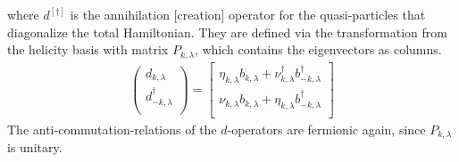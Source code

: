 where $d^{[\dag]}$ is the annihilation [creation] operator for the quasi-particles that diagonalize the total Hamiltonian.
They are defined via the transformation from the helicity basis with matrix $P_{k,\lambda}$, which contains the eigenvectors as columns. 
\begin{align} \label{eq:d_basis_def}
 \left( {\begin{array}{c}
            d_{k, \lambda}\\
          d^{\dag}_{-k, \lambda} \\
        \end{array} } 
        \right)
    = \left[ {\begin{array}{c}
            \eta_{k, \lambda} b_{k, \lambda} + \nu^{\dag}_{k, \lambda}b^{\dag}_{-k, \lambda} \\
          \nu_{k, \lambda}b_{k, \lambda} + \eta_{k,\lambda}b^{\dag}_{-k, \lambda} \\
        \end{array} } 
        \right] 
\end{align}
The anti-commutation-relations of the $d$-operators are fermionic again, since $P_{k,\lambda}$ is unitary.


